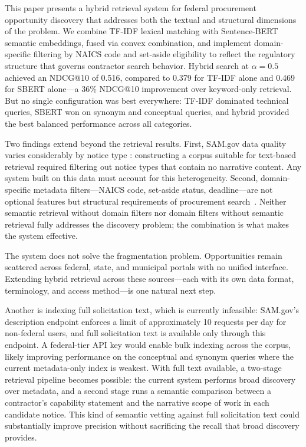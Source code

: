 \documentclass[10pt,twocolumn]{article}
\begin{document}
This paper presents a hybrid retrieval system for federal procurement opportunity discovery that addresses both the textual and structural dimensions of the problem. We combine TF-IDF lexical matching with Sentence-BERT semantic embeddings, fused via convex combination, and implement domain-specific filtering by NAICS code and set-aside eligibility to reflect the regulatory structure that governs contractor search behavior. Hybrid search at $\alpha = 0.5$ achieved an NDCG@10 of 0.516, compared to 0.379 for TF-IDF alone and 0.469 for SBERT alone---a 36\% NDCG@10 improvement over keyword-only retrieval. But no single configuration was best everywhere: TF-IDF dominated technical queries, SBERT won on synonym and conceptual queries, and hybrid provided the best balanced performance across all categories.

Two findings extend beyond the retrieval results. First, SAM.gov data quality varies considerably by notice type \cite{Omari2025}: constructing a corpus suitable for text-based retrieval required filtering out notice types that contain no narrative content. Any system built on this data must account for this heterogeneity. Second, domain-specific metadata filters---NAICS code, set-aside status, deadline---are not optional features but structural requirements of procurement search~\cite{SBA2024}. Neither semantic retrieval without domain filters nor domain filters without semantic retrieval fully addresses the discovery problem; the combination is what makes the system effective.

The system does not solve the fragmentation problem. Opportunities remain scattered across federal, state, and municipal portals with no unified interface. Extending hybrid retrieval across these sources---each with its own data format, terminology, and access method---is one natural next step.

Another is indexing full solicitation text, which is currently infeasible: SAM.gov's description endpoint enforces a limit of approximately 10 requests per day for non-federal users, and full solicitation text is available only through this endpoint. A federal-tier API key would enable bulk indexing across the corpus, likely improving performance on the conceptual and synonym queries where the current metadata-only index is weakest. With full text available, a two-stage retrieval pipeline becomes possible: the current system performs broad discovery over metadata, and a second stage runs a semantic comparison between a contractor's capability statement and the narrative scope of work in each candidate notice. This kind of semantic vetting against full solicitation text could substantially improve precision without sacrificing the recall that broad discovery provides.
\end{document}
